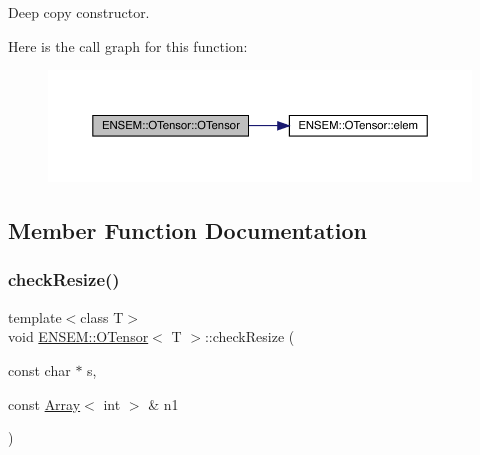 Deep copy constructor. 

Here is the call graph for this function\+:
\nopagebreak
\begin{figure}[H]
\begin{center}
\leavevmode
\includegraphics[width=350pt]{da/d8a/classENSEM_1_1OTensor_aaf07253b5940da32a50af556d2f2afc6_cgraph}
\end{center}
\end{figure}


\subsection{Member Function Documentation}
\mbox{\label{classENSEM_1_1OTensor_aa273eae7f1de4b37e91302da5edf279b}} 
\subsubsection{\texorpdfstring{checkResize()}{checkResize()}\hspace{0.1cm}{\footnotesize\ttfamily [1/6]}}
{\footnotesize\ttfamily template$<$class T$>$ \\
void \mbox{\hyperlink{classENSEM_1_1OTensor}{E\+N\+S\+E\+M\+::\+O\+Tensor}}$<$ T $>$\+::check\+Resize (\begin{DoxyParamCaption}\item[{const char $\ast$}]{s,  }\item[{const \mbox{\hyperlink{classXMLArray_1_1Array}{Array}}$<$ int $>$ \&}]{n1 }\end{DoxyParamCaption})\hspace{0.3cm}{\ttfamily [inline]}}

